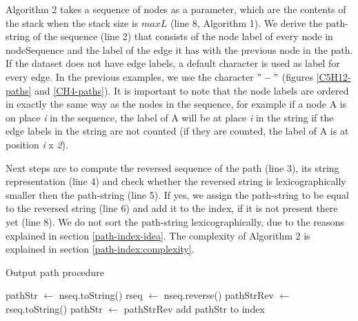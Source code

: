 \documentclass{l4proj}
\newcounter{example}[section]
\begin{document}
Algorithm 2 takes a sequence of nodes as a parameter, which are the contents of the stack when the stack size is $maxL$ (line 8, Algorithm 1). We derive the path-string of the sequence (line 2) that consists of the node label of every node in nodeSequence and the label of the edge it has with the previous node in the path. If the dataset does not have edge labels, a default character is used as label for every edge. In the previous examples, we use the character $"-"$ (figures \ref{C5H12-paths} and \ref{CH4-paths}). It is important to note that the node labels are ordered in exactly the same way as the nodes in the sequence, for example if a node A is on place \textit{i} in the sequence, the label of A will be at place \textit{i} in the string if the edge labels in the string are not counted (if they are counted, the label of A is at position \textit{i} x \textit{2}).\par
Next steps are to compute the reversed sequence of the path (line 3), its string representation (line 4) and check whether the reversed string is lexicographically smaller then the path-string (line 5). If yes, we assign the path-string to be equal to the reversed string (line 6) and add it to the index, if it is not present there yet (line 8). We do not sort the path-string lexicographically, due to the reasons explained in section \ref{path-index-idea}. The complexity of Algorithm 2 is explained in section \ref{path-index:complexity}.\par

\begin{algorithm}
\centering
\caption{Output path procedure}
\label{alg:generatePath}
\begin{algorithmic}[1]
\State pathStr $\gets$ nseq.toString() 
\State rseq $\gets$ nseq.reverse() 
\State pathStrRev $\gets$ rseq.toString() 
\State pathStr $\gets$ pathStrRev 
\EndIf
{}
\State add pathStr to index
\EndIf
\EndProcedure
\end{algorithmic}
\end{algorithm}


\end{document}

